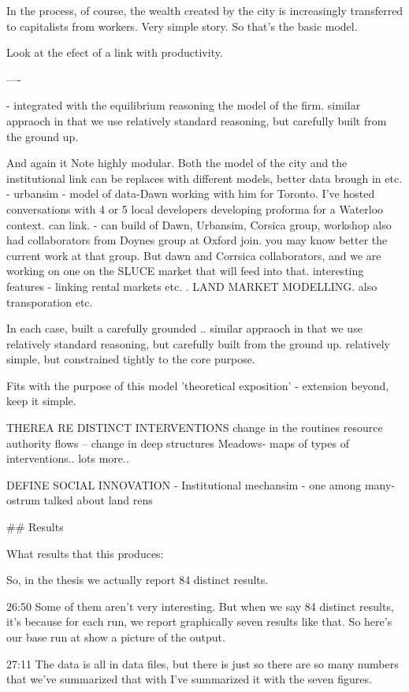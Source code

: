 \documentclass[]{article}
\begin{document}
In the process, of course, the wealth created by the city is increasingly transferred to capitalists from workers. Very simple story.
So that's the basic model.

Look at the efect of a link with productivity.

----

- integrated with the equilibrium reasoning the model of the firm.
 similar appraoch in that we use relatively standard reasoning, but carefully built from the ground up. 

And again it Note highly modular. Both the model of the city and the institutional link can be replaces with different models, better data brough in etc. - urbansim - model of data-Dawn working with him for Toronto. I've hosted conversations with 4 or 5 local developers developing proforma for a Waterloo context.  can link. 
- can build of Dawn, Urbansim, Corsica group, workshop also had collaborators from Doynes group at Oxford join. you may know better the current work at that group. But dawn and Corrsica collaborators, and we are working on one on the SLUCE market that will feed into that. interesting features - linking rental markets etc. .
LAND MARKET MODELLING.
also transporation etc.

In each case, built a carefully grounded .. similar appraoch in that we use relatively standard reasoning, but carefully built from the ground up. 
relatively simple, but constrained tightly to the core purpose.

Fits with the purpose of this model 'theoretical exposition' - extension beyond, keep it simple.

THEREA RE DISTINCT INTERVENTIONS
change in the routines resource authority flows -- change in deep structures
Meadows- maps of types of interventions.. lots more.. 

DEFINE SOCIAL INNOVATION - 
Institutional mechansim - one among many- ostrum talked about land rens



## Results


What results that this produces:

So, in the thesis we actually report 84 distinct results.

26:50
Some of them aren't very interesting. But when we say 84 distinct results, it's because for each run, we report graphically seven results like that. So here's our base run at show a picture of the output.

27:11
The data is all in data files, but there is just so there are so many numbers that we've summarized that with I've summarized it with the seven figures.
\end{document}
